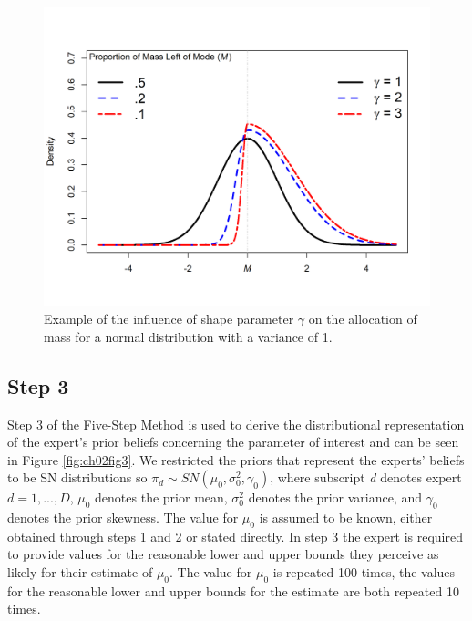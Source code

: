 \documentclass[openright,titlepage,12pt,a4paper]{book}
\begin{document}
\begin{figure}

{\centering \includegraphics[width=0.85\linewidth]{figures/chapter_2/Figure_2} 

}

\caption{Example of the influence of shape parameter $\gamma$ on the allocation of mass for a normal distribution with a variance of 1.}\label{fig:ch02fig2}
\end{figure}

\hypertarget{step-3}{%
\subsection{Step 3}\label{step-3}}

Step 3 of the Five-Step Method is used to derive the distributional representation of the expert's prior beliefs concerning the parameter of interest and can be seen in Figure \ref{fig:ch02fig3}. We restricted the priors that represent the experts' beliefs to be SN distributions so \(\pi_d \sim SN(\mu_0, \sigma^2_0, \gamma_0)\), where subscript \emph{d} denotes expert \(d = 1,...,D\), \(\mu_0\) denotes the prior mean, \(\sigma^2_0\) denotes the prior variance, and \(\gamma_0\) denotes the prior skewness. The value for \(\mu_0\) is assumed to be known, either obtained through steps 1 and 2 or stated directly. In step 3 the expert is required to provide values for the reasonable lower and upper bounds they perceive as likely for their estimate of \(\mu_0\). The value for \(\mu_0\) is repeated 100 times, the values for the reasonable lower and upper bounds for the estimate are both repeated 10 times.
\end{document}
